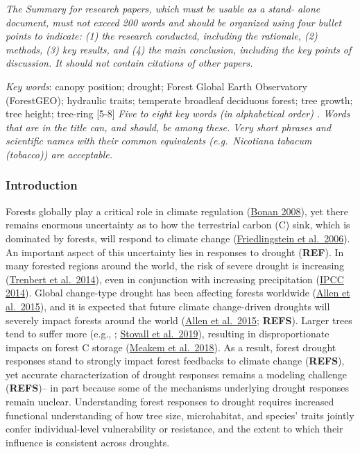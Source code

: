 \documentclass[]{article}
\begin{document}
\emph{The Summary for research papers, which must be usable as a stand-
alone document, must not exceed 200 words and should be organized using
four bullet points to indicate: (1) the research conducted, including
the rationale, (2) methods, (3) key results, and (4) the main
conclusion, including the key points of discussion. It should not
contain citations of other papers.}

\emph{Key words}: canopy position; drought; Forest Global Earth
Observatory (ForestGEO); hydraulic traits; temperate broadleaf deciduous
forest; tree growth; tree height; tree-ring {[}5-8{]} \emph{Five to
eight key words (in alphabetical order) . Words that are in the title
can, and should, be among these. Very short phrases and scientific names
with their common equivalents (e.g.~Nicotiana tabacum (tobacco)) are
acceptable.}

\newpage

\hypertarget{introduction}{%
\subsubsection{Introduction}\label{introduction}}

Forests globally play a critical role in climate regulation
(\href{https://science.sciencemag.org/content/320/5882/1444}{Bonan
2008}), yet there remains enormous uncertainty as to how the terrestrial
carbon (C) sink, which is dominated by forests, will respond to climate
change
(\href{https://journals.ametsoc.org/doi/full/10.1175/JCLI3800.1}{Friedlingstein
et al.~2006}). An important aspect of this uncertainty lies in responses
to drought (\textbf{REF}). In many forested regions around the world,
the risk of severe drought is increasing
(\href{https://www.nature.com/articles/nclimate2067}{Trenbert et
al.~2014}), even in conjunction with increasing precipitation
(\href{https://www.cambridge.org/core/books/climate-change-2014-impacts-adaptation-and-vulnerability-part-b-regional-aspects/036A899BD52861D61B0D519C5F2B9334}{IPCC
2014}). Global change-type drought has been affecting forests worldwide
(\href{https://doi.org/10.1016/j.foreco.2009.09.001}{Allen et
al.~2015}), and it is expected that future climate change-driven
droughts will severely impact forests around the world
(\href{https://doi.org/10.1016/j.foreco.2009.09.001}{Allen et al.~2015};
\textbf{REFS}). Larger trees tend to suffer more (e.g.,
\citep{bennett_larger_2015};
\href{https://doi.org/10.1038/s41467-019-12380-6}{Stovall et al.~2019}),
resulting in disproportionate impacts on forest C storage
(\href{https://nph.onlinelibrary.wiley.com/doi/10.1111/nph.14633}{Meakem
et al.~2018}). As a result, forest drought responses stand to strongly
impact forest feedbacks to climate change (\textbf{REFS}), yet accurate
characterization of drought responses remains a modeling challenge
(\textbf{REFS})-- in part because some of the mechanisms underlying
drought responses remain unclear. Understanding forest responses to
drought requires increased functional understanding of how tree size,
microhabitat, and species' traits jointly confer individual-level
vulnerability or resistance, and the extent to which their influence is
consistent across droughts.
\end{document}
